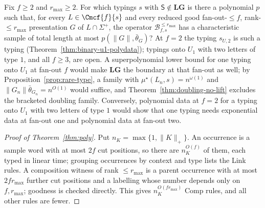 \begin{openproblem}
\label{op:fanout-two}
Fix $f\ge2$ and $r_{\max}\ge2$.  For which typings $s$ with
$\mathsf S\notin\mathbf{LG}$ is there a polynomial $p$ such that, for every
$L\in\Cmcf{f}{s}$ and every reduced good fan-out-$\le f$, rank-$\le r_{\max}$
presentation $G$ of $L\cap\Sigma^+$, the operator
$\mathcal B^{\le r_{\max}}_{f,s}$ has a characteristic sample of total length
at most $p(\|G\|,\bar\theta_G)$?  At $f=2$ the typing $s_{U,2}$ is such a typing
(Theorem~\ref{thm:binary-u1-polydata}); typings onto $U_1$ with two letters of
type $1$, and all $f\ge3$, are open.  A superpolynomial lower bound for one
typing onto $U_1$ at fan-out $f$ would make $\mathbf{LG}$ the boundary at that
fan-out as well; by Proposition~\ref{prop:rare-type}, a family with
$\mu^\star(L_n,s)=n^{\omega(1)}$ and $\|G_n\|\bar\theta_{G_n}=n^{O(1)}$ would
suffice, and Theorem~\ref{thm:doubling-no-lift} excludes the bracketed doubling
family.  Conversely, polynomial data at $f=2$ for a typing onto $U_1$ with two
letters of type $1$ would show that one typing needs exponential data at fan-out
one and polynomial data at fan-out two.
\end{openproblem}

\begin{proof}[Proof of Theorem~\ref{thm:poly}]
Put $n_K=\max\{1,\|K\|_+\}$.  An occurrence is a sample word with at most $2f$ cut
positions, so there are $n_K^{O(f)}$ of them, each typed in linear time; grouping
occurrences by context and type lists the Link rules.  A composition witness of rank
$\le r_{\max}$ is a parent occurrence with at most $2fr_{\max}$ further cut positions
and a labelling whose number depends only on $f,r_{\max}$; goodness is checked
directly.  This gives $n_K^{O(fr_{\max})}$ Comp rules, and all other rules are fewer.
\end{proof}

